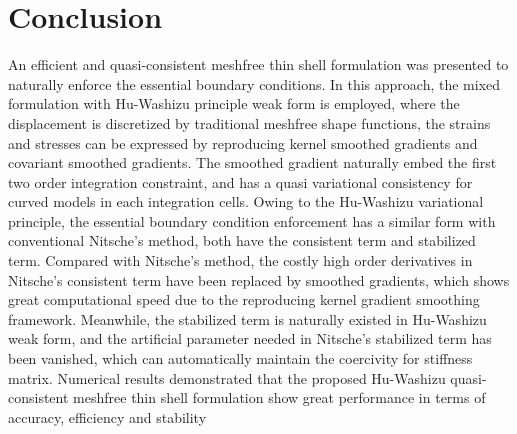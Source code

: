 \section{Conclusion}\label{conclusion}
An efficient and quasi-consistent meshfree thin shell formulation was presented to naturally enforce the essential boundary conditions. In this approach, the mixed formulation with Hu-Washizu principle weak form is employed, where the displacement is discretized by traditional meshfree shape functions, the strains and stresses can be expressed by reproducing kernel smoothed gradients and covariant smoothed gradients. The smoothed gradient naturally embed the first two order integration constraint, and has a quasi variational consistency for curved models in each integration cells. Owing to the Hu-Washizu variational principle, the essential boundary condition enforcement has a similar form with conventional Nitsche's method, both have the consistent term and stabilized term. Compared with Nitsche's method, the costly high order derivatives in Nitsche's consistent term have been replaced by smoothed gradients, which shows great computational speed due to the reproducing kernel gradient smoothing framework. Meanwhile, the stabilized term is naturally existed in Hu-Washizu weak form, and the artificial parameter needed in Nitsche's stabilized term has been vanished, which can automatically maintain the coercivity for stiffness matrix. Numerical results demonstrated that the proposed Hu-Washizu quasi-consistent meshfree thin shell formulation show great performance in terms of accuracy, efficiency and stability 

